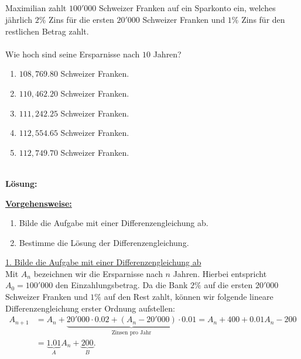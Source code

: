\newpage

\subsection*{}
Maximilian zahlt $100'000$ Schweizer Franken auf ein Sparkonto ein, welches jährlich $2 \%$ Zins für die ersten $20'000$ Schweizer Franken und $1 \%$ Zins für den restlichen Betrag zahlt.\\
\\
Wie hoch sind seine Ersparnisse nach $10 $ Jahren?
\renewcommand{\labelenumi}{(\alph{enumi})}
\begin{enumerate}
	\item
	$108,769.80$ Schweizer Franken.
	\item
	$110,462.20$ Schweizer Franken.	
	\item 
	$111,242.25$ Schweizer Franken.
	\item
	$112,554.65$ Schweizer Franken.
	\item
	$112,749.70$ Schweizer Franken.
\end{enumerate}
\ \\
\textbf{Lösung:}
\begin{mdframed}
\underline{\textbf{Vorgehensweise:}}
\renewcommand{\labelenumi}{\theenumi.}
\begin{enumerate}
\item Bilde die Aufgabe mit einer Differenzengleichung ab.
\item Bestimme die Lösung der Differenzengleichung.
\end{enumerate}
\end{mdframed}

\underline{1. Bilde die Aufgabe mit einer Differenzengleichung ab}\\
Mit $A_n$ bezeichnen wir die Ersparnisse nach $n$ Jahren. Hierbei entspricht $A_0 = 100'000$ den Einzahlungsbetrag. Da die Bank $2 \% $ auf die ersten $20'000$ Schweizer Franken und $1 \% $ auf den Rest zahlt, können wir folgende lineare Differenzengleichung erster Ordnung aufstellen:
\begin{align*}
	A_{n+1}
	&=
	A_n + \underbrace{20'000 \cdot 0.02 + (A_n - 20'000) \cdot 0.01}_{\textrm{Zinsen pro Jahr}}
	=
	A_n + 400 + 0.01 A_n - 200\\
	&= \underbrace{1.01}_{A} A_n + \underbrace{200}_B.
\end{align*}

